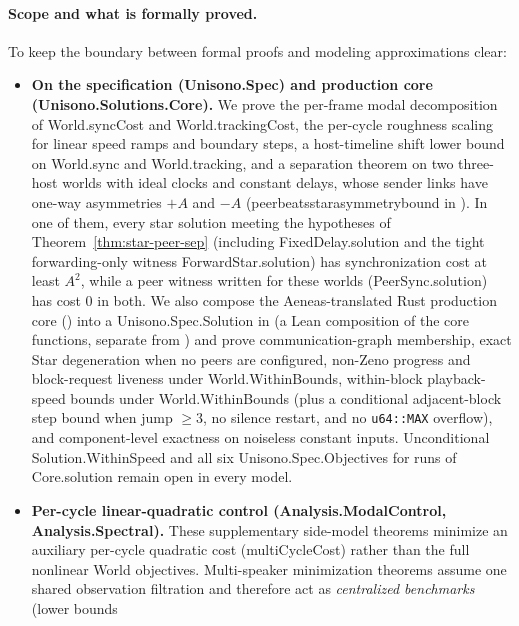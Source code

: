 \documentclass[11pt,a4paper]{article}
\DeclareRobustCommand{\lean}[1]{{\ttfamily\def\_{\textunderscore\allowbreak}#1}}
\theoremstyle{definition}
\begin{document}
\paragraph{Scope and what is formally proved.}
To keep the boundary between formal proofs and modeling approximations clear:
\begin{itemize}
\item \textbf{On the specification (\lean{Unisono.Spec}) and production core
  (\lean{Unisono.Solutions.Core}).} We prove the per-frame modal decomposition
  of \lean{World.syncCost} and \lean{World.trackingCost}, the per-cycle
  roughness scaling for linear speed ramps and boundary steps, a host-timeline
  shift lower bound on \lean{World.sync} and \lean{World.tracking}, and a
  separation theorem on two three-host worlds with ideal clocks and constant
  delays, whose sender links have one-way asymmetries $+A$ and $-A$
  (\lean{peer\_beats\_star\_asymmetry\_bound} in ). In
  one of them, every star solution meeting the hypotheses of
  Theorem~\ref{thm:star-peer-sep} (including \lean{FixedDelay.solution} and the
  tight forwarding-only witness \lean{ForwardStar.solution}) has
  synchronization cost at least $A^2$, while a peer witness written for these
  worlds (\lean{PeerSync.solution}) has cost $0$ in both. We also compose the
  Aeneas-translated Rust production core () into a
  \lean{Unisono.Spec.Solution} in  (a Lean
  composition of the core functions, separate from ) and
  prove communication-graph membership, exact Star degeneration when no peers
  are configured, non-Zeno progress and block-request liveness under
  \lean{World.WithinBounds}, within-block playback-speed bounds under
  \lean{World.WithinBounds} (plus a conditional adjacent-block step bound when
  \lean{jump} $\ge 3$, no silence restart, and no \texttt{u64::MAX} overflow),
  and component-level exactness on noiseless constant inputs. Unconditional
  \lean{Solution.WithinSpeed} and all six \lean{Unisono.Spec.Objectives} for
  runs of \lean{Core.solution} remain open in every model.
\item \textbf{Per-cycle linear-quadratic control
  (\lean{Analysis.ModalControl}, \lean{Analysis.Spectral}).} These
  supplementary side-model theorems minimize an auxiliary per-cycle quadratic
  cost (\lean{multiCycleCost}) rather than the full nonlinear \lean{World}
  objectives. Multi-speaker minimization theorems assume one shared observation
  filtration and therefore act as \emph{centralized benchmarks} (lower bounds

\end{itemize}
\end{document}
